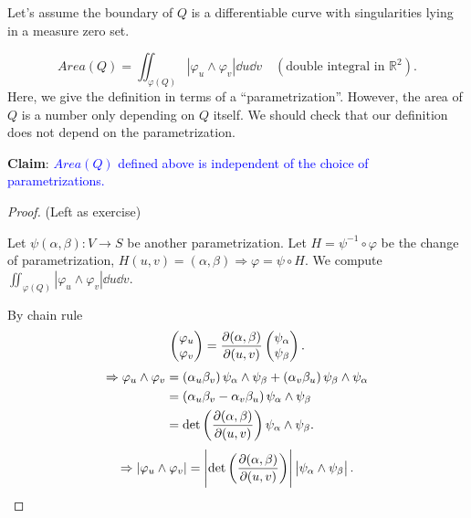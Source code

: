 \begin{enumerate}[(1)]
\begin{center}
\begin{tikzpicture}[x=0.75pt,y=0.75pt,yscale=-0.9,xscale=0.9]
\end{tikzpicture}
    \end{center}
    Let's assume the boundary of \(Q\) is a differentiable curve with 
    singularities lying in a measure zero set.
\begin{definition}[Area of \(Q\)]
    \[Area(Q)=\iint_{\varphi(Q)} \left|\varphi_u\wedge 
    \varphi_v \right|\dd u\dd v \quad(\text{double integral in }
    \mathbb{R}^2).\]
    Here, we give the definition in terms of a ``parametrization''. 
    However, the area of \(Q\) is a number only depending on \(Q\)
    itself. We should check that our definition does not depend on 
    the parametrization.
\end{definition}
\textbf{Claim}: 
\textcolor{blue}{\(Area(Q)\) defined above is independent of the
choice of parametrizations.}
\begin{proof} (Left as exercise)

    Let \(\psi(\alpha,\beta)\colon V\to S\) be another parametrization. 
    Let \(H=\psi^{-1}\circ \varphi\) be the change of parametrization,
    \(H(u,v)=(\alpha,\beta)\)\(\Rightarrow\varphi =\psi \circ H\).
    We compute \(\iint_{\varphi(Q)} \left|\varphi_u\wedge 
    \varphi_v \right|\dd u\dd v\).

    By chain rule 
    \[
        \begin{pmatrix}
            \varphi_u\\ \varphi_v
        \end{pmatrix}=
        \pdv{(\alpha,\beta)}{(u,v)}\begin{pmatrix}
            \psi_\alpha\\
            \psi_\beta
        \end{pmatrix}    .
    \]
    \begin{align*}
        \Rightarrow \varphi_u\wedge\varphi_v&=
        \left(\alpha_u\beta_v\right)\psi_\alpha\wedge\psi_\beta+
        \left(\alpha_v\beta_u\right)\psi_\beta\wedge\psi_\alpha\\
        &=\left(\alpha_u\beta_v-\alpha_v\beta_u\right)
        \psi_\alpha\wedge\psi_\beta\\
        &=\det\left(\pdv{(\alpha,\beta)}{(u,v)}\right)
        \psi_\alpha\wedge\psi_\beta.
    \end{align*}
    \[\Rightarrow \left|
        \varphi_u\wedge \varphi_v 
    \right|=\left|\det\left(\pdv{(\alpha,\beta)}{(u,v)}\right)\right|
    \left|\psi_\alpha\wedge\psi_\beta\right|.\]
    

\end{proof}
\end{enumerate}
